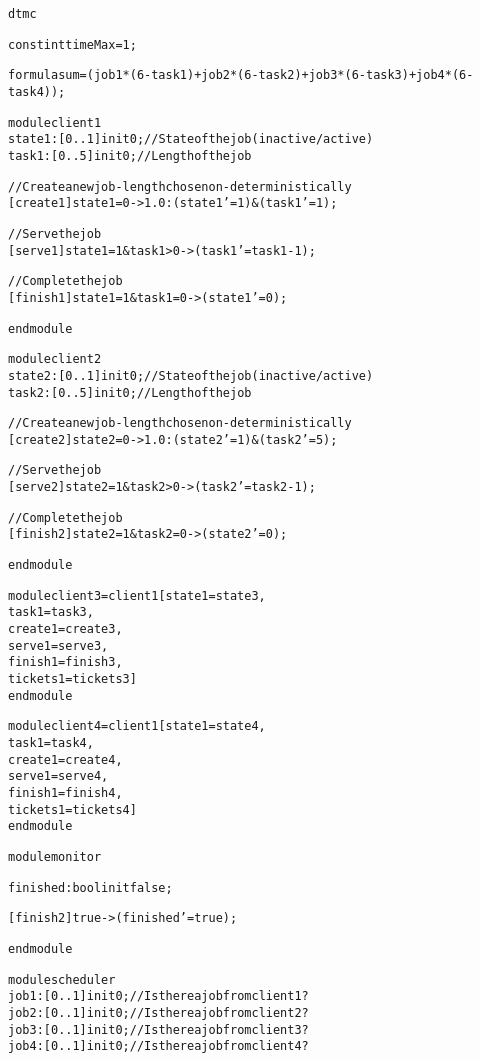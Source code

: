 \begin{alltt}
dtmc

const int timeMax = 1;

formula sum = (job1*(6-task1)+job2*(6-task2)+job3*(6-task3)+job4*(6-task4));

module client1
  state1 : [0..1] init 0; // State of the job (inactive/active)
  task1  : [0..5] init 0; // Length of the job
  
  // Create a new job - length chose non-deterministically
  [create1] state1=0 -> 1.0 : (state1'=1) & (task1'=1);

  // Serve the job
  [serve1] state1=1 & task1>0 -> (task1'=task1-1);

  // Complete the job
  [finish1] state1=1 & task1=0 -> (state1'=0);

endmodule

module client2
  state2 : [0..1] init 0; // State of the job (inactive/active)
  task2  : [0..5] init 0; // Length of the job
  
  // Create a new job - length chose non-deterministically
  [create2] state2=0 -> 1.0 : (state2'=1) & (task2'=5);

  // Serve the job
  [serve2] state2=1 & task2>0 -> (task2'=task2-1);

  // Complete the job
  [finish2] state2=1 & task2=0 -> (state2'=0);

endmodule

module client3 = client1 [state1=state3,
                          task1=task3,
                          create1=create3,
                          serve1=serve3,
                          finish1=finish3,
                          tickets1=tickets3 ]
endmodule

module client4 = client1 [state1=state4,
                          task1=task4,
                          create1=create4,
                          serve1=serve4,
                          finish1=finish4,
                          tickets1=tickets4 ]
endmodule

module monitor 

  finished : bool init false;

  [finish2] true -> (finished' = true);

endmodule

module scheduler
  job1 : [0..1] init 0; // Is there a job from client1?
  job2 : [0..1] init 0; // Is there a job from client2?
  job3 : [0..1] init 0; // Is there a job from client3?
  job4 : [0..1] init 0; // Is there a job from client4?


\end{alltt}
